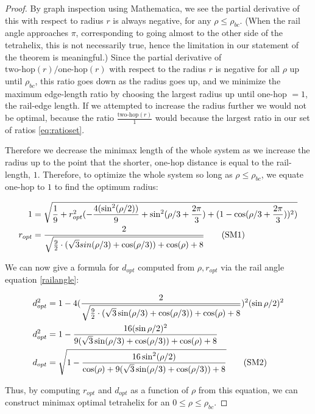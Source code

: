 \documentclass[review]{siamonline1116}
\newcommand\numberthis{\addtocounter{equation}{1}\tag{\theequation}}
\begin{document}
\begin{proof}
By graph inspection using Mathematica, we see the partial derivative of this with respect to
radius $r$ is always negative, for any $\rho \leq \rho_{bc}$. (When the rail angle approaches
$\pi$, corresponding to going almost to the other side of the tetrahelix, this is not necessarily true, hence the
limitation in our statement of the theorem is meaningful.)
Since the partial derivative of $\text{two-hop}(r) / \text{one-hop}(r)$ with respect to the
radius $r$ is negative for all $\rho$ up until $\rho_{bc}$, this ratio goes down
as the radius goes up, and 
we minimize the maximum edge-length ratio by choosing the largest radius
up until one-hop $= 1$, the rail-edge length. If we attempted to increase the radius further
we would not be optimal, because the ratio $\frac{\text{two-hop}(r)}{1}$ would because the
largest ratio in our set of ratios \cref{eq:ratioset}.

Therefore we decrease the minimax length
of the whole system as we increase the radius
up to the point that the shorter, one-hop distance is equal to the rail-length, $1$.
Therefore, to optimize the whole system so long as $\rho \leq \rho_{bc}$,
we equate one-hop to $1$ to find the optimum radius:


\begin{align*}
  1 &=  \sqrt{\frac{1}{9}  + r_{opt}^2(-\frac{4 (\sin^2( \rho / 2))}{9} + \sin^2(\rho/3+ \frac{2\pi}{3})  + (1 - \cos(\rho/3 + \frac{2\pi}{3}))^2)} \\
  r_{opt} &= \frac{2}{\sqrt{\frac{9}{2} \cdot ( \sqrt{3} sin(\rho/3) + \cos(\rho/3)) + \cos(\rho)+ 8 }} \numberthis  \label{eqrhoopt} \\
\end{align*}

We can now give a formula for $ d_{opt} $ computed from $\rho, r_{opt}$ via the rail angle equation \eqref{railangle}:

\begin{align*}
  d_{opt}^2 &= 1 - 4 (\frac{2}{\sqrt{\frac{9}{2} \cdot ( \sqrt{3} \sin(\rho/3) + \cos(\rho/3)) + \cos(\rho)+ 8 }})^2 (\sin{ \rho / 2})^2   \\
  d_{opt}^2 &= 1 - \frac{16(\sin{ \rho / 2})^2}{9 ( \sqrt{3} \sin(\rho/3) + \cos(\rho/3)) + \cos(\rho)+ 8 }    \\
    d_{opt} &= \sqrt{1 - \frac{16 \sin^2(\rho / 2) }{ \cos(\rho) + 9( \sqrt{3} \sin(\rho/3) + \cos(\rho/3)) + 8 }}    \numberthis  \label{dopt}  \\      
\end{align*}

Thus, by computing $r_{opt}$  and $d_{opt}$ as a function of $\rho$ from this equation, we can construct minimax optimal tetrahelix for an $0 \leq \rho \leq \rho_{bc}$.
\end{proof}
\end{document}
